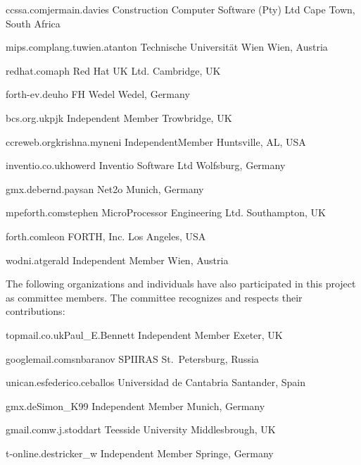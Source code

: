 	{ccssa.com}{jermain.davies}
	{Construction Computer Software (Pty) Ltd}
	{Cape Town, South Africa}

	{mips.complang.tuwien.at}{anton}
	{Technische Universit\"at Wien}
	{Wien, Austria}

	{redhat.com}{aph}
	{Red Hat UK Ltd.}
	{Cambridge, UK}

	{forth-ev.de}{uho}
	{FH Wedel}
	{Wedel, Germany}

	{bcs.org.uk}{pjk}
	{Independent Member}
	{Trowbridge, UK}

	{ccreweb.org}{krishna.myneni}
	{IndependentMember}
	{Huntsville, AL, USA}

	{inventio.co.uk}{howerd}
	{Inventio Software Ltd}
	{Wolfsburg, Germany}

	{gmx.de}{bernd.paysan}
	{Net2o}
	{Munich, Germany}

	{mpeforth.com}{stephen}
	{MicroProcessor Engineering Ltd.}
	{Southampton, UK}

	{forth.com}{leon}
	{FORTH, Inc.}
	{Los Angeles, USA}

	{wodni.at}{gerald}
	{Independent Member}
	{Wien, Austria}

The following organizations and individuals have also participated in
this project as committee members. The committee recognizes and
respects their contributions:

	{topmail.co.uk}{Paul\_E.Bennett}
	{Independent Member}
	{Exeter, UK}

	{googlemail.com}{snbaranov}
	{SPIIRAS}
	{St.\ Petersburg, Russia}

	{unican.es}{federico.ceballos}
	{Universidad de Cantabria}
	{Santander, Spain}

	{gmx.de}{Simon\_K99}
	{Independent Member}
	{Munich, Germany}

	{gmail.com}{w.j.stoddart}
	{Teesside University}
	{Middlesbrough, UK}

	{t-online.de}{stricker\_w}
	{Independent Member}
	{Springe, Germany}

